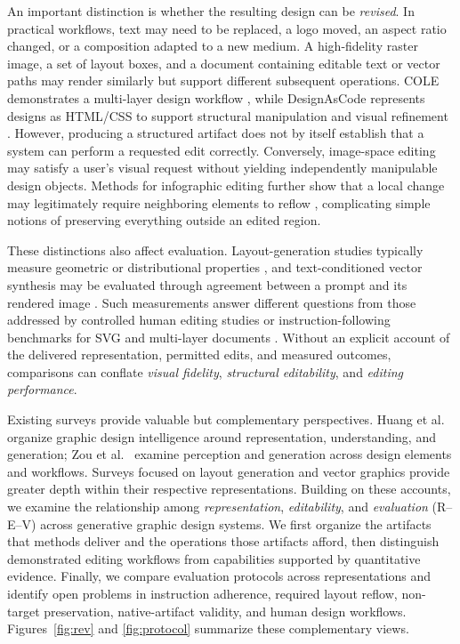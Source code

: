 An important distinction is whether the resulting design can be \emph{revised}. In practical workflows, text may need to be replaced, a logo moved, an aspect ratio changed, or a composition adapted to a new medium. A high-fidelity raster image, a set of layout boxes, and a document containing editable text or vector paths may render similarly but support different subsequent operations. COLE demonstrates a multi-layer design workflow \citep{cole2023}, while DesignAsCode represents designs as HTML/CSS to support structural manipulation and visual refinement \citep{designascode2026}. However, producing a structured artifact does not by itself establish that a system can perform a requested edit correctly. Conversely, image-space editing may satisfy a user's visual request without yielding independently manipulable design objects. Methods for infographic editing further show that a local change may legitimately require neighboring elements to reflow \citep{yang2026infoedit}, complicating simple notions of preserving everything outside an edited region.

These distinctions also affect evaluation. Layout-generation studies typically measure geometric or distributional properties \citep{layoutdm2023}, and text-conditioned vector synthesis may be evaluated through agreement between a prompt and its rendered image \citep{vectorfusion2023}. Such measurements answer different questions from those addressed by controlled human editing studies \citep{vinci2021} or instruction-following benchmarks for SVG and multi-layer documents \citep{svgeditbench2024,mildedit2026}. Without an explicit account of the delivered representation, permitted edits, and measured outcomes, comparisons can conflate \emph{visual fidelity}, \emph{structural editability}, and \emph{editing performance}.

Existing surveys provide valuable but complementary perspectives. Huang et al.~\citep{huang2023survey} organize graphic design intelligence around representation, understanding, and generation; Zou et al.~\citep{zou2025fragment} examine perception and generation across design elements and workflows. Surveys focused on layout generation \citep{shi2023layoutsurvey} and vector graphics \citep{tian2024vectorsurvey} provide greater depth within their respective representations. Building on these accounts, we examine the relationship among \emph{representation}, \emph{editability}, and \emph{evaluation} (R--E--V) across generative graphic design systems. We first organize the artifacts that methods deliver and the operations those artifacts afford, then distinguish demonstrated editing workflows from capabilities supported by quantitative evidence. Finally, we compare evaluation protocols across representations and identify open problems in instruction adherence, required layout reflow, non-target preservation, native-artifact validity, and human design workflows. Figures~\ref{fig:rev} and \ref{fig:protocol} summarize these complementary views.

